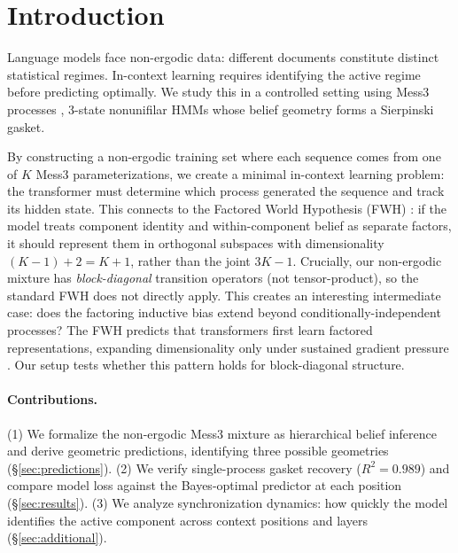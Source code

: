 \section{Introduction}

Language models face non-ergodic data: different documents constitute distinct statistical regimes. In-context learning requires identifying the active regime before predicting optimally. We study this in a controlled setting using Mess3 processes \cite{marzen2017nearly, shai2024transformers}, 3-state nonunifilar HMMs whose belief geometry forms a Sierpinski gasket.

By constructing a non-ergodic training set where each sequence comes from one of $K$ Mess3 parameterizations, we create a minimal in-context learning problem: the transformer must determine which process generated the sequence and track its hidden state. This connects to the Factored World Hypothesis (FWH) \cite{shai2026factored}: if the model treats component identity and within-component belief as separate factors, it should represent them in orthogonal subspaces with dimensionality $(K{-}1) + 2 = K{+}1$, rather than the joint $3K{-}1$. Crucially, our non-ergodic mixture has \emph{block-diagonal} transition operators (not tensor-product), so the standard FWH does not directly apply. This creates an interesting intermediate case: does the factoring inductive bias extend beyond conditionally-independent processes? The FWH predicts that transformers first learn factored representations, expanding dimensionality only under sustained gradient pressure \cite{shai2026factored}. Our setup tests whether this pattern holds for block-diagonal structure.

\paragraph{Contributions.} (1) We formalize the non-ergodic Mess3 mixture as hierarchical belief inference and derive geometric predictions, identifying three possible geometries (\S\ref{sec:predictions}). (2) We verify single-process gasket recovery ($R^2 = 0.989$) and compare model loss against the Bayes-optimal predictor at each position (\S\ref{sec:results}). (3) We analyze synchronization dynamics: how quickly the model identifies the active component across context positions and layers (\S\ref{sec:additional}).
